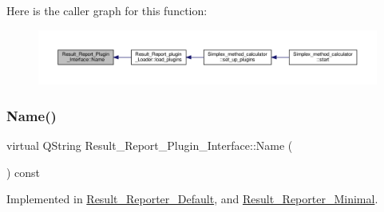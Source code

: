 Here is the caller graph for this function\+:\nopagebreak
\begin{figure}[H]
\begin{center}
\leavevmode
\includegraphics[width=350pt]{classResult__Report__Plugin__Interface_ad86b327f9bebee3f52666abeea1ca03f_icgraph}
\end{center}
\end{figure}
\mbox{\label{classResult__Report__Plugin__Interface_ad86b327f9bebee3f52666abeea1ca03f}} 
\subsubsection{\texorpdfstring{Name()}{Name()}\hspace{0.1cm}{\footnotesize\ttfamily [3/3]}}
{\footnotesize\ttfamily virtual Q\+String Result\+\_\+\+Report\+\_\+\+Plugin\+\_\+\+Interface\+::\+Name (\begin{DoxyParamCaption}{ }\end{DoxyParamCaption}) const\hspace{0.3cm}{\ttfamily [pure virtual]}}



Implemented in \hyperlink{classResult__Reporter__Default_af1794a748e246ed0113e85e1f25e2907}{Result\+\_\+\+Reporter\+\_\+\+Default}, and \hyperlink{classResult__Reporter__Minimal_ae6bd38556e2b7b724ab077574665aae5}{Result\+\_\+\+Reporter\+\_\+\+Minimal}.

\mbox{\label{classResult__Report__Plugin__Interface_a7dc45f2c25e0f4f4f99b2d7cd1799aa0}} 
